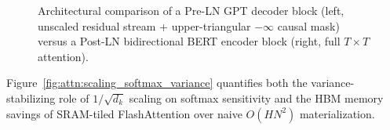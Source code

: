 \documentclass[../../../../master.tex]{subfiles}
\begin{document}
\begin{figure}[htbp]
\caption{Architectural comparison of a Pre-LN GPT decoder block (left, unscaled residual stream + upper-triangular $-\infty$ causal mask) versus a Post-LN bidirectional BERT encoder block (right, full $T \times T$ attention).}
\label{fig:attn:mha_gpt_block}
\end{figure}

Figure~\ref{fig:attn:scaling_softmax_variance} quantifies both the variance-stabilizing role of $1/\sqrt{d_k}$ scaling on softmax sensitivity and the HBM memory savings of SRAM-tiled FlashAttention over naive $O(H N^2)$ materialization.
\end{document}
